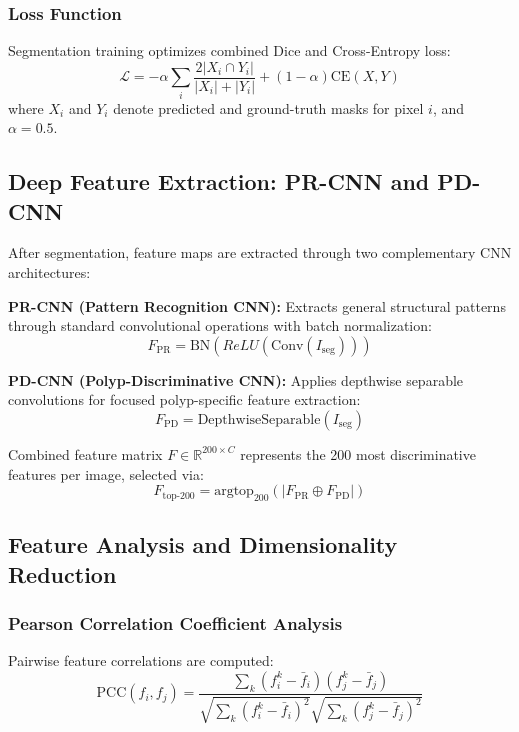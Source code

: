 \documentclass[11pt,a4paper]{article}
\begin{document}
\subsubsection{Loss Function}
Segmentation training optimizes combined Dice and Cross-Entropy loss:
\begin{equation}
\mathcal{L} = -\alpha \sum_{i} \frac{2|X_i \cap Y_i|}{|X_i| + |Y_i|} + (1-\alpha) \text{CE}(X, Y)
\end{equation}
where $X_i$ and $Y_i$ denote predicted and ground-truth masks for pixel $i$, and $\alpha=0.5$.

\subsection{Deep Feature Extraction: PR-CNN and PD-CNN}

After segmentation, feature maps are extracted through two complementary CNN architectures:

\textbf{PR-CNN (Pattern Recognition CNN):} Extracts general structural patterns through standard convolutional operations with batch normalization:
\begin{equation}
F_{\text{PR}} = \text{BN}(ReLU(\text{Conv}(I_{\text{seg}})))
\end{equation}

\textbf{PD-CNN (Polyp-Discriminative CNN):} Applies depthwise separable convolutions for focused polyp-specific feature extraction:
\begin{equation}
F_{\text{PD}} = \text{DepthwiseSeparable}(I_{\text{seg}})
\end{equation}

Combined feature matrix $F \in \mathbb{R}^{200 \times C}$ represents the 200 most discriminative features per image, selected via:
\begin{equation}
F_{\text{top-200}} = \text{argtop}_{200}(|F_{\text{PR}} \oplus F_{\text{PD}}|)
\end{equation}

\subsection{Feature Analysis and Dimensionality Reduction}

\subsubsection{Pearson Correlation Coefficient Analysis}
Pairwise feature correlations are computed:
\begin{equation}
\text{PCC}(f_i, f_j) = \frac{\sum_{k}(f_i^k - \bar{f}_i)(f_j^k - \bar{f}_j)}{\sqrt{\sum_{k}(f_i^k - \bar{f}_i)^2} \sqrt{\sum_{k}(f_j^k - \bar{f}_j)^2}}
\end{equation}
\end{document}
